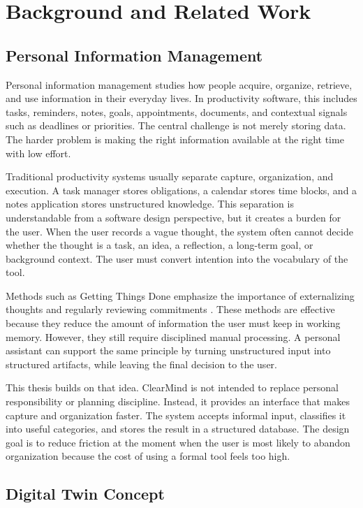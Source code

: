 \chapter{Background and Related Work}

\section{Personal Information Management}

Personal information management studies how people acquire, organize, retrieve, and use information in their everyday lives. In productivity software, this includes tasks, reminders, notes, goals, appointments, documents, and contextual signals such as deadlines or priorities. The central challenge is not merely storing data. The harder problem is making the right information available at the right time with low effort.

Traditional productivity systems usually separate capture, organization, and execution. A task manager stores obligations, a calendar stores time blocks, and a notes application stores unstructured knowledge. This separation is understandable from a software design perspective, but it creates a burden for the user. When the user records a vague thought, the system often cannot decide whether the thought is a task, an idea, a reflection, a long-term goal, or background context. The user must convert intention into the vocabulary of the tool.

Methods such as Getting Things Done emphasize the importance of externalizing thoughts and regularly reviewing commitments \cite{allen2015getting}. These methods are effective because they reduce the amount of information the user must keep in working memory. However, they still require disciplined manual processing. A personal assistant can support the same principle by turning unstructured input into structured artifacts, while leaving the final decision to the user.

This thesis builds on that idea. ClearMind is not intended to replace personal responsibility or planning discipline. Instead, it provides an interface that makes capture and organization faster. The system accepts informal input, classifies it into useful categories, and stores the result in a structured database. The design goal is to reduce friction at the moment when the user is most likely to abandon organization because the cost of using a formal tool feels too high.

\section{Digital Twin Concept}

